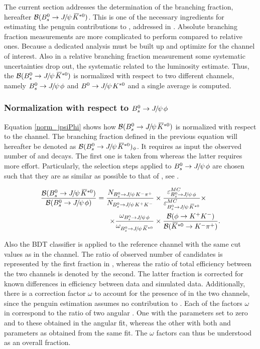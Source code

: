 
The current section addresses the determination of the \BsJpsiKst branching fraction, hereafter $\BRof\BsJpsiKst$.
This is one of the necessary ingredients for estimating the penguin contributions to \phis, addressed in .
Absolute branching fraction measurements are more complicated to perform compared to relative ones. Because a
dedicated analysis must be built up and optimize for the channel of interest. Also in a relative branching fraction
measurement some systematic uncertainties drop out, \ie the systematic related to the luminosity estimate. Thus, the $\BRof\BsJpsiKst$ is
normalized with respect to two different channels, namely $\BsJpsiPhi$ and $\BdJpsiKst$ and a single average is computed.

\subsubsection{Normalization with respect to $\BsJpsiPhi$}
Equation \ref{norm_jpsiPhi} shows how $\BRof\BsJpsiKst$ is normalized with respect to the \BsJpsiPhi channel.
The branching fraction defined in the previous equation will hereafter be denoted as $\BRof{\BsJpsiKst}_\Pphi$.
It requires as input the observed number of \BsJpsiKst and \BsJpsiPhi decays. The first one is taken from
 whereas the latter requires more effort. Particularly, the selection steps applied
to $\BsJpsiPhi$ are chosen such that they are as similar as possible to that of \BsJpsiKst, see .

\begin{align}
  \centering
\frac{\BRof\BsJpsiKst}{\BRof\BsJpsiPhi} = \frac{N_{\BsJpsiKpi}}{N_{\BsJpsiKK}}
                                  &\times \frac{\varepsilon_{\BsJpsiPhi}^{MC}}{\varepsilon_{\BsJpsiKst}^{MC}}
                                   \times \nonumber \\
                                  \times \frac{\omega_{\BsJpsiPhi}}{\omega_{\BsJpsiKst}}
                                  & \times \frac{\BRof{\Pphi\to\kaon^+\kaon^-}}{\BRof{\Kstarzb\to\kaon^-\pion^+}}.
\label{norm_jpsiPhi}
\end{align}

\noindent Also the BDT classifier is applied to the reference channel
with the same cut values as in the \BsJpsiKst channel. The ratio of observed number of candidates is represented by the
first fraction in , whereas the ratio of total efficiency between the two channels is denoted
by the second. The latter fraction is corrected for known differences in efficiency between data and simulated data.
Additionally, there is a correction factor $\omega$ to account for the presence of \swave in the two
channels, since the penguin estimation assumes no \swave contribution to \BsJpsiKst. Each of the factors $\omega$ in
 correspond to the ratio of two angular \pdfs. One with the \swave parameters set to zero and
\pwave to these obtained in the angular fit,  whereas the other with both \pwave and \swave parameters as obtained
from the same fit. The $\omega$ factors can thus be understood as an overall \swave fraction.


